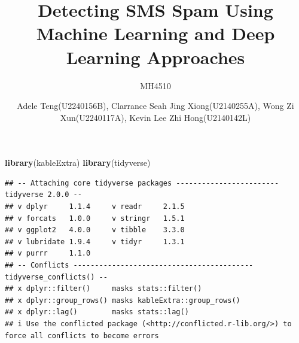 \documentclass[
  9pt,
  t]{article}
\title{Detecting SMS Spam Using Machine Learning and Deep Learning
Approaches}
\subtitle{MH4510}
\author{Adele Teng(U2240156B), Clarrance Seah Jing Xiong(U2140255A),
Wong Zi Xun(U2240117A), Kevin Lee Zhi Hong(U2140142L)}
\date{}
\newenvironment{Shaded}{\begin{snugshade}}{\end{snugshade}}
\newcommand{\FunctionTok}[1]{\textcolor[rgb]{0.13,0.29,0.53}{\textbf{#1}}}
\newcommand{\NormalTok}[1]{#1}
\begin{document}
\maketitle

\begin{Shaded}
\begin{Highlighting}[]
\FunctionTok{library}\NormalTok{(kableExtra)}
\FunctionTok{library}\NormalTok{(tidyverse)}
\end{Highlighting}
\end{Shaded}

\begin{verbatim}
## -- Attaching core tidyverse packages ------------------------ tidyverse 2.0.0 --
## v dplyr     1.1.4     v readr     2.1.5
## v forcats   1.0.0     v stringr   1.5.1
## v ggplot2   4.0.0     v tibble    3.3.0
## v lubridate 1.9.4     v tidyr     1.3.1
## v purrr     1.1.0     
## -- Conflicts ------------------------------------------ tidyverse_conflicts() --
## x dplyr::filter()     masks stats::filter()
## x dplyr::group_rows() masks kableExtra::group_rows()
## x dplyr::lag()        masks stats::lag()
## i Use the conflicted package (<http://conflicted.r-lib.org/>) to force all conflicts to become errors
\end{verbatim}
\end{document}
